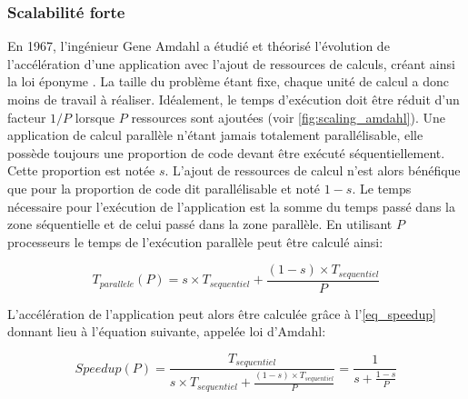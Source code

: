     \subsubsection{Scalabilité forte} \label{sec:amdhal}
        
        En 1967, l'ingénieur Gene Amdahl a étudié et théorisé l'évolution de l'accélération d'une application avec l'ajout de ressources de calculs, créant ainsi la loi éponyme \cite{Amdahl1967}. La taille du problème étant fixe, chaque unité de calcul a donc moins de travail à réaliser. Idéalement, le temps d'exécution doit être réduit d'un facteur $1/P$ lorsque $P$ ressources sont ajoutées (voir \autoref{fig:scaling_amdahl}). Une application de calcul parallèle n'étant jamais totalement parallélisable, elle possède toujours une proportion de code devant être exécuté séquentiellement. Cette proportion est notée $s$. L'ajout de ressources de calcul n'est alors bénéfique que pour la proportion de code dit parallélisable et noté $1-s$. Le temps nécessaire pour l'exécution de l'application est la somme du temps passé dans la zone séquentielle et de celui passé dans la zone parallèle. En utilisant $P$ processeurs le temps de l'exécution parallèle peut être calculé ainsi: 

        
            \begin{equation}
            T_{parallele}(P) = s \times T_{sequentiel} + \frac{(1-s) \times T_{sequentiel}}{P}
            \end{equation}
        
        L'accélération de l'application peut alors être calculée grâce à l'\autoref{eq_speedup} donnant lieu à l'équation suivante, appelée loi d'Amdahl:
        
                
            \begin{equation}
            \label{eq_amdahl}
            Speedup (P) = \frac{T_{sequentiel}}{s \times T_{sequentiel} + \frac{(1-s) \times T_{sequentiel}}{P}} =  \frac{1}{s + \frac{1-s}{P}}
            \end{equation}
        
